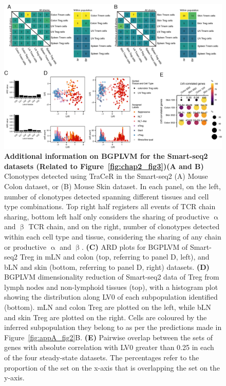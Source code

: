 \begin{figure}[ht!] 
\centering    
\includegraphics[width=1.0\textwidth]{Appendix1/Figs/appA_fig4.png} %
\caption[Additional information on BGPLVM for the Smart-seq2 datasets]{\textbf{Additional information on BGPLVM for the Smart-seq2 datasets (Related to Figure~\ref{fig:chap2_fig3})}\newline\textbf{(A and B)} Clonotypes detected using TraCeR in the Smart-seq2 (A) Mouse Colon dataset, or (B) Mouse Skin dataset. In each panel, on the left, number of clonotypes detected spanning different tissues and cell type combinations. Top right half registers all events of TCR chain sharing, bottom left half only considers the sharing of productive ${\upalpha}$ and ${\upbeta}$ TCR chain, and on the right, number of clonotypes detected within each cell type and tissue, considering the sharing of any chain or productive ${\upalpha}$ and ${\upbeta}$. \textbf{(C)} ARD plots for BGPLVM of Smart-seq2 Treg in mLN and colon (top, referring to panel D, left), and bLN and skin (bottom, referring to panel D, right) datasets. \textbf{(D)} BGPLVM dimensionality reduction of Smart-seq2 data of Treg from lymph nodes and non-lymphoid tissues (top), with a histogram plot showing the distribution along LV0 of each subpopulation identified (bottom). mLN and colon Treg are plotted on the left, while bLN and skin Treg are plotted on the right. Cells are coloured by the inferred subpopulation they belong to as per the predictions made in Figure~\ref{fig:appA_fig2}B. \textbf{(E)} Pairwise overlap between the sets of genes with absolute correlation with LV0 greater than 0.25 in each of the four steady-state datasets. The percentages refer to the proportion of the set on the x-axis that is overlapping the set on the y-axis.}
\label{fig:appA_fig4}
\end{figure}


